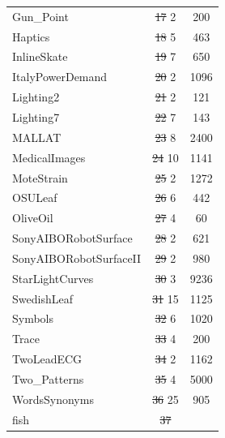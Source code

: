 \documentclass[natbib,smallextended]{svjour3}
\providecommand{\DIFdeltex}[1]{{\protect\color{red}\sout{#1}}}                      %
\providecommand{\DIFdelFL}[1]{\DIFdel{#1}} %
\providecommand{\DIFdelbeginFL}{} %
\providecommand{\DIFdelendFL}{} %
\providecommand{\DIFdel}[1]{\texorpdfstring{\DIFdeltex{#1}}{}} %
\newcommand{\DIFscaledelfig}{0.5}
\newlength{\DIFdelgraphicswidth} %
\newlength{\DIFdelgraphicsheight} %
\newcommand{\DIFdelincludegraphics}[2][]{%
\sbox{\DIFdelgraphicsbox}{\DIFOincludegraphics[#1]{#2}}%
\settoboxwidth{\DIFdelgraphicswidth}{\DIFdelgraphicsbox} %
\settoboxtotalheight{\DIFdelgraphicsheight}{\DIFdelgraphicsbox} %
\scalebox{\DIFscaledelfig}{%
\parbox[b]{\DIFdelgraphicswidth}{\usebox{\DIFdelgraphicsbox}\\[-\baselineskip] \rule{\DIFdelgraphicswidth}{0em}}\llap{\resizebox{\DIFdelgraphicswidth}{\DIFdelgraphicsheight}{%
\setlength{\unitlength}{\DIFdelgraphicswidth}%
\begin{picture}(1,1)%
\thicklines\linethickness{2pt} %
{\color[rgb]{1,0,0}\put(0,0){\framebox(1,1){}}}%
{\color[rgb]{1,0,0}\put(0,0){\line( 1,1){1}}}%
{\color[rgb]{1,0,0}\put(0,1){\line(1,-1){1}}}%
\end{picture}%
}\hspace*{3pt}}} %
} %
\DeclareRobustCommand{\DIFdelbeginFL}{\DIFOdelbeginFL \let\includegraphics\DIFdelincludegraphics} %
\DeclareRobustCommand{\DIFdelendFL}{\DIFOaddendFL \let\includegraphics\DIFOincludegraphics} %
\begin{document}
\begin{table} [h!]
\begin{center}
\begin{tabular}{lcc}
Gun\_Point &   \DIFdelbeginFL \DIFdelFL{17 }%
\DIFdelendFL 2 &  200 \\
Haptics &   \DIFdelbeginFL \DIFdelFL{18 }%
\DIFdelendFL 5 &  463 \\
InlineSkate  &  \DIFdelbeginFL \DIFdelFL{19 }%
\DIFdelendFL 7 &  650 \\
ItalyPowerDemand  &  \DIFdelbeginFL \DIFdelFL{20 }%
\DIFdelendFL 2 & 1096 \\
Lighting2  &  \DIFdelbeginFL \DIFdelFL{21 }%
\DIFdelendFL 2 &  121 \\
Lighting7  &  \DIFdelbeginFL \DIFdelFL{22 }%
\DIFdelendFL 7 &  143 \\
MALLAT  &  \DIFdelbeginFL \DIFdelFL{23 }%
\DIFdelendFL 8 & 2400 \\
MedicalImages  & \DIFdelbeginFL \DIFdelFL{24 }%
\DIFdelendFL 10 & 1141 \\
MoteStrain  &  \DIFdelbeginFL \DIFdelFL{25 }%
\DIFdelendFL 2 & 1272 \\
OSULeaf &   \DIFdelbeginFL \DIFdelFL{26 }%
\DIFdelendFL 6 &  442 \\
OliveOil &   \DIFdelbeginFL \DIFdelFL{27 }%
\DIFdelendFL 4 &   60 \\
SonyAIBORobotSurface &   \DIFdelbeginFL \DIFdelFL{28 }%
\DIFdelendFL 2 &  621 \\
SonyAIBORobotSurfaceII &   \DIFdelbeginFL \DIFdelFL{29 }%
\DIFdelendFL 2 &  980 \\
StarLightCurves  &  \DIFdelbeginFL \DIFdelFL{30 }%
\DIFdelendFL 3 & 9236 \\
SwedishLeaf & \DIFdelbeginFL \DIFdelFL{31 }%
\DIFdelendFL 15 & 1125 \\
Symbols  &  \DIFdelbeginFL \DIFdelFL{32 }%
\DIFdelendFL 6 & 1020 \\
Trace &   \DIFdelbeginFL \DIFdelFL{33 }%
\DIFdelendFL 4 &  200 \\
TwoLeadECG  &  \DIFdelbeginFL \DIFdelFL{34 }%
\DIFdelendFL 2 & 1162 \\
Two\_Patterns  &  \DIFdelbeginFL \DIFdelFL{35 }%
\DIFdelendFL 4 & 5000 \\
WordsSynonyms  & \DIFdelbeginFL \DIFdelFL{36 }%
\DIFdelendFL 25 &  905 \\
fish  &  \DIFdelbeginFL \DIFdelFL{37 }%

\end{tabular}
\end{center}
\end{table}
\end{document}
